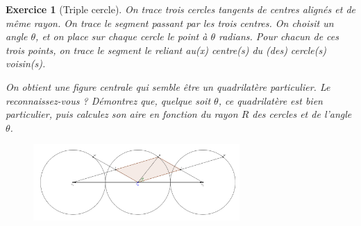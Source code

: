 \documentclass[12pt]{article}
\theoremstyle{break}
\newtheorem{exo}{Exercice}
\begin{document}
\begin{exo}[Triple cercle]
On trace trois cercles tangents de centres alignés et de même rayon. On trace le segment passant par les trois centres. On choisit un angle $\theta$, et on place sur chaque cercle le point à $\theta$ radians. Pour chacun de ces trois points, on trace le segment le reliant au(x) centre(s) du (des) cercle(s) voisin(s).

On obtient une figure centrale qui semble être un quadrilatère particulier. Le reconnaissez-vous ? Démontrez que, quelque soit $\theta$, ce quadrilatère est bien particulier, puis calculez son aire en fonction du rayon $R$ des cercles et de l'angle $\theta$.

\begin{figure}[h!]
	\centering
    \includegraphics[width=0.7\textwidth]{images/TripleCercle.png}
    
\end{figure}
\end{exo}
\end{document}
